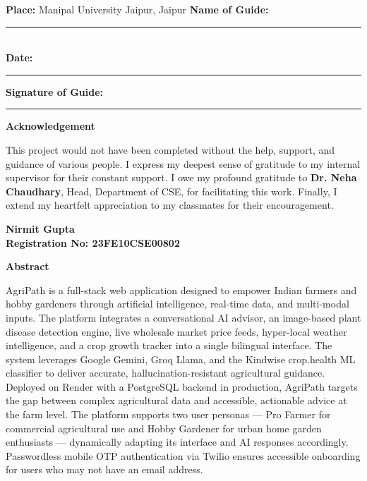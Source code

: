 \documentclass[12pt,a4paper]{article}
\begin{document}
\vspace{0.8in}
\noindent \textbf{Place:} Manipal University Jaipur, Jaipur \hfill \textbf{Name of Guide:} \rule{3cm}{0.4pt} \\
\noindent \textbf{Date:} \rule{3cm}{0.4pt} \hfill \textbf{Signature of Guide:} \rule{3cm}{0.4pt}

\newpage
\begin{center}
    {\Large \textbf{Acknowledgement}}
\end{center}
\vspace{0.2in}
This project would not have been completed without the help, support, and guidance of various people. I express my deepest sense of gratitude to my internal supervisor for their constant support. I owe my profound gratitude to \textbf{Dr. Neha Chaudhary}, Head, Department of CSE, for facilitating this work. Finally, I extend my heartfelt appreciation to my classmates for their encouragement.

\vspace{0.5in}
\noindent \textbf{Nirmit Gupta} \\
\textbf{Registration No: 23FE10CSE00802}

\newpage
\begin{center}
    {\Large \textbf{Abstract}}
\end{center}
\vspace{0.2in}
AgriPath is a full-stack web application designed to empower Indian farmers and hobby gardeners through artificial intelligence, real-time data, and multi-modal inputs. The platform integrates a conversational AI advisor, an image-based plant disease detection engine, live wholesale market price feeds, hyper-local weather intelligence, and a crop growth tracker into a single bilingual interface. The system leverages Google Gemini, Groq Llama, and the Kindwise crop.health ML classifier to deliver accurate, hallucination-resistant agricultural guidance. Deployed on Render with a PostgreSQL backend in production, AgriPath targets the gap between complex agricultural data and accessible, actionable advice at the farm level. The platform supports two user personas --- Pro Farmer for commercial agricultural use and Hobby Gardener for urban home garden enthusiasts --- dynamically adapting its interface and AI responses accordingly. Passwordless mobile OTP authentication via Twilio ensures accessible onboarding for users who may not have an email address.
\end{document}
